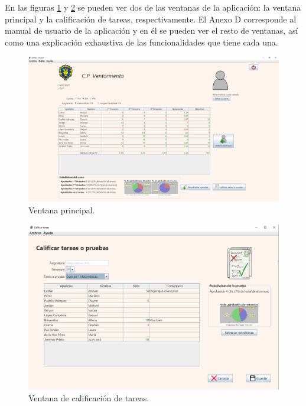 En las figuras \ref{Fig:resventanaprincipal} y \ref{Fig:rescalificaciontareas} se pueden ver dos de las ventanas de la aplicación: la ventana principal y la calificación de tareas, respectivamente. El Anexo D corresponde al manual de usuario de la aplicación y en él se pueden ver el resto de ventanas, así como una explicación exhaustiva de las funcionalidades que tiene cada una.

\begin{figure}[H]
\centering\includegraphics[width=1\linewidth]{figs/ventanaprincipal.png}
\caption{Ventana principal.}
\label{Fig:resventanaprincipal}
\end{figure}

\begin{figure}[H]
\centering\includegraphics[width=1\linewidth]{figs/calificartareas.png}
\caption{Ventana de calificación de tareas.}
\label{Fig:rescalificaciontareas}
\end{figure}

\newpage

